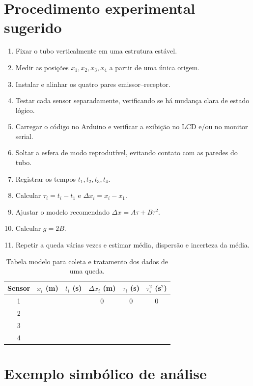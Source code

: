 \documentclass[11pt,a4paper]{article}
\begin{document}
\section{Procedimento experimental sugerido}

\begin{enumerate}
  \item Fixar o tubo verticalmente em uma estrutura estável.
  \item Medir as posições $x_1,x_2,x_3,x_4$ a partir de uma única origem.
  \item Instalar e alinhar os quatro pares emissor--receptor.
  \item Testar cada sensor separadamente, verificando se há mudança clara de estado lógico.
  \item Carregar o código no Arduino e verificar a exibição no LCD e/ou no monitor serial.
  \item Soltar a esfera de modo reprodutível, evitando contato com as paredes do tubo.
  \item Registrar os tempos $t_1,t_2,t_3,t_4$.
  \item Calcular $\tau_i=t_i-t_1$ e $\Delta x_i=x_i-x_1$.
  \item Ajustar o modelo recomendado $\Delta x=A\tau+B\tau^2$.
  \item Calcular $g=2B$.
  \item Repetir a queda várias vezes e estimar média, dispersão e incerteza da média.
\end{enumerate}

\begin{table}[htbp]
\centering
\caption{Tabela modelo para coleta e tratamento dos dados de uma queda.}
\label{tab:dados}
\begin{tabular}{cccccc}
\toprule
Sensor & $x_i$ (m) & $t_i$ (s) & $\Delta x_i$ (m) & $\tau_i$ (s) & $\tau_i^2$ (s$^2$) \\
\midrule
1 & & & 0 & 0 & 0 \\
2 & & & & & \\
3 & & & & & \\
4 & & & & & \\
\bottomrule
\end{tabular}
\end{table}

\section{Exemplo simbólico de análise}
\end{document}
